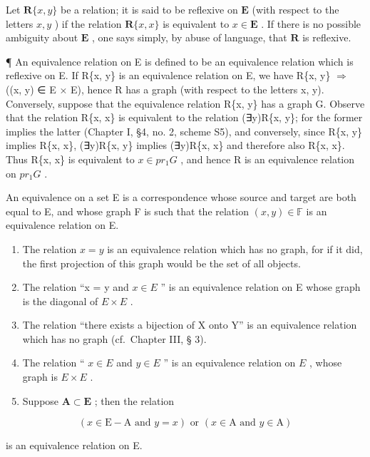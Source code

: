 Let \(\mathbf{R}\{x, y\}\) be a relation; it is said to be reflexive on \(\mathbf{E}\) (with respect to the letters \(x, y\) ) if the relation \(\mathbf{R}\{x, x\}\) is equivalent to \(x \in \mathbf{E}\) . If there is no possible ambiguity about \(\mathbf{E}\) , one says simply, by abuse of language, that \(\mathbf{R}\) is reflexive.

¶ An equivalence relation on E is defined to be an equivalence relation which is reflexive on E. If R\{x, y\} is an equivalence relation on E, we have R\{x, y\} \(\Longrightarrow\) ((x, y) ∈ E × E), hence R has a graph (with respect to the letters x, y). Conversely, suppose that the equivalence relation R\{x, y\} has a graph G. Observe that the relation R\{x, x\} is equivalent to the relation (∃y)R\{x, y\}; for the former implies the latter (Chapter I, §4, no. 2, scheme S5), and conversely, since R\{x, y\} implies R\{x, x\}, (∃y)R\{x, y\} implies (∃y)R\{x, x\} and therefore also R\{x, x\}. Thus R\{x, x\} is equivalent to \(x \in pr_{1}G\) , and hence R is an equivalence relation on \(pr_{1}G\) .

An equivalence on a set E is a correspondence whose source and target are both equal to E, and whose graph F is such that the relation \((x, y) \in \mathbb{F}\) is an equivalence relation on E.


\begin{enumerate}
\def\labelenumi{(\arabic{enumi})}
\item
  The relation \(x = y\) is an equivalence relation which has no graph, for if it did, the first projection of this graph would be the set of all objects.
\item
  The relation ``x = y and \(x \in E\) '' is an equivalence relation on E whose graph is the diagonal of \(E \times E\) .
\item
  The relation ``there exists a bijection of X onto Y'' is an equivalence relation which has no graph (cf.~Chapter III, § 3).
\item
  The relation `` \(x \in E\) and \(y \in E\) '' is an equivalence relation on \(E\) , whose graph is \(E \times E\) .
\item
  Suppose \(\mathbf{A} \subset \mathbf{E}\) ; then the relation
\end{enumerate}

\[
(x \in \mathrm{E} - \mathrm{A} \text { and } y = x) \text { or } (x \in \mathrm{A} \text { and } y \in \mathrm{A})
\]

is an equivalence relation on E.

